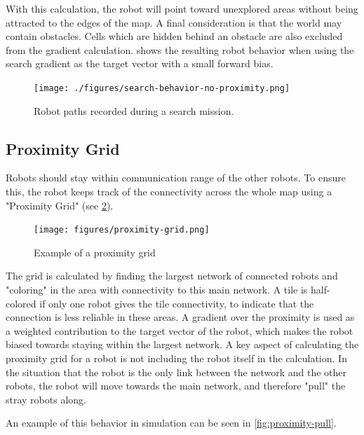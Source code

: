 With this calculation, the robot will point toward unexplored areas without being attracted to the edges of the map. A final consideration is that the world may contain obstacles. Cells which are hidden behind an obstacle are also excluded from the gradient calculation.  shows the resulting robot behavior when using the search gradient as the target vector with a small forward bias.

\begin{figure}[h]
    \begin{center}
        \texttt{[image: ./figures/search-behavior-no-proximity.png]}
    \end{center}
    \caption{Robot paths recorded during a search mission.}
    \label{fig:search-no-proximity}
\end{figure}

\subsection{Proximity Grid}
Robots should stay within communication range of the other robots. To ensure this, the robot keeps track of the connectivity {\color{red} across} the whole map using a "Proximity Grid" (see \cref{fig:proximity-grid}). \\
\begin{figure}[h]
    \begin{center}
        \texttt{[image: figures/proximity-grid.png]}
    \end{center}
    \caption{Example of a proximity grid}\label{fig:proximity-grid}
\end{figure}

The grid is calculated by finding the largest network of connected robots and "coloring" in the area with connectivity to this main network. A tile is half-colored if only one robot gives the tile connectivity, to indicate that the connection is less reliable in these areas. A {\color{red} gradient} over the proximity is used as a weighted contribution to the target vector of the robot, which makes the robot biased towards staying within the largest network. A key aspect of calculating the proximity grid for a robot is not including the robot itself in the calculation. In the situation that the robot is the only link between the network and the other robots, the robot will move towards the main network, and therefore "pull" the stray robots along. 

An example of this behavior in simulation can be seen in \cref{fig:proximity-pull}.

